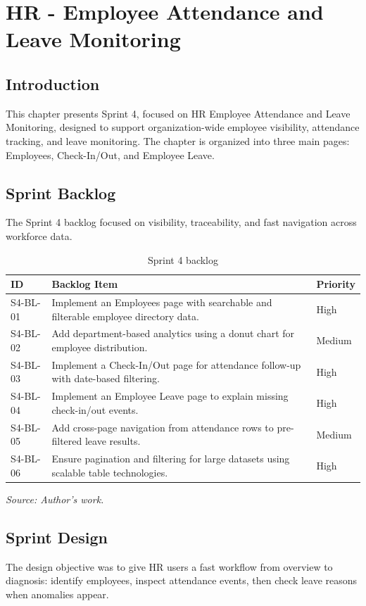 \chapter{HR - Employee Attendance and Leave Monitoring}
\minitoc
\clearpage
\section{Introduction}
This chapter presents Sprint 4, focused on HR Employee Attendance and Leave Monitoring, designed to support organization-wide employee visibility, attendance tracking, and leave monitoring. The chapter is organized into three main pages: Employees, Check-In/Out, and Employee Leave.

\section{Sprint Backlog}
The Sprint 4 backlog focused on visibility, traceability, and fast navigation across workforce data.

\begin{table}[H]
\centering
\renewcommand{\arraystretch}{1.2}
\begin{tabular}{|l|>{\raggedright\arraybackslash}p{10.2cm}|l|}
\hline
\textbf{ID} & \textbf{Backlog Item} & \textbf{Priority} \\
\hline
S4-BL-01 & Implement an Employees page with searchable and filterable employee directory data. & High \\
\hline
S4-BL-02 & Add department-based analytics using a donut chart for employee distribution. & Medium \\
\hline
S4-BL-03 & Implement a Check-In/Out page for attendance follow-up with date-based filtering. & High \\
\hline
S4-BL-04 & Implement an Employee Leave page to explain missing check-in/out events. & High \\
\hline
S4-BL-05 & Add cross-page navigation from attendance rows to pre-filtered leave results. & Medium \\
\hline
S4-BL-06 & Ensure pagination and filtering for large datasets using scalable table technologies. & High \\
\hline
\end{tabular}
\caption{Sprint 4 backlog}
\label{tab:sprint-4-backlog}
{\footnotesize\textit{Source: Author's work.}}
\end{table}

\section{Sprint Design}
The design objective was to give HR users a fast workflow from overview to diagnosis: identify employees, inspect attendance events, then check leave reasons when anomalies appear.

